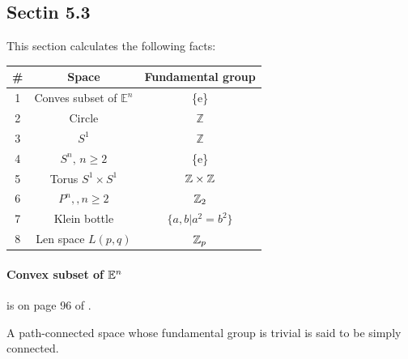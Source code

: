 \subsection{Sectin 5.3}
\label{sec:Sectin-5.3}
This section calculates the following facts:
\begin{table}[H]
    \centering
    \begin{tabular}{c c c}
        \hline
        \#&  Space                           & Fundamental group \\
          \hline
        1 &  Conves subset of $\mathbb{E}^n$ & \{e\} \\
        2 &  Circle                          & $\mathbb{Z}$ \\
        3 & $S^1$                           & $\mathbb{Z}$ \\
        4 & $S^n,\, n\geq 2$                & \{e\} \\
        5 & Torus $S^1\times S^1$           & $\mathbb{Z}\times\mathbb{Z}$ \\
        6 & $P^n,, n\geq 2$                 & $\mathbb{Z}_2$ \\
        7 & Klein bottle                    & $\{a,b|a^2=b^2\}$ \\
        8 & Len space $L(p,q)$              & $\mathbb{Z}_p$ \\
          \hline
    \end{tabular}
\end{table}

\paragraph{Convex subset of $\mathbb{E}^n$} is on page 96 of \cite{book}.
\begin{defi}
    A path-connected space whose fundamental group is trivial is said
    to be simply connected.
\end{defi}

